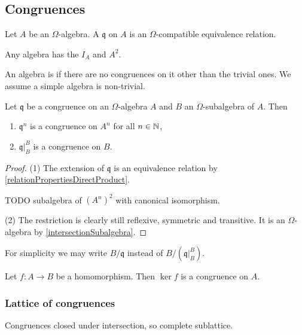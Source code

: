 \subsection{Congruences}
\begin{definition}
Let $A$ be an $\Omega$-algebra. A  $\mathfrak{q}$ on $A$ is an $\Omega$-compatible equivalence relation.
\end{definition}

\begin{example}
Any algebra has the  $I_A$ and $A^2$.
\end{example}

An algebra is  if there are no congruences on it other than the trivial ones. We assume a simple algebra is non-trivial.

\begin{lemma} \label{basicCongruenceLemma}
Let $\mathfrak{q}$ be a congruence on an $\Omega$-algebra $A$ and $B$ an $\Omega$-subalgebra of $A$. Then
\begin{enumerate}
\item $\mathfrak{q}^n$ is a congruence on $A^n$ for all $n\in \mathbb{N}$,
\item $\mathfrak{q}|_B^B$ is a congruence on $B$.
\end{enumerate}
\end{lemma}
\begin{proof}
(1) The extension of $\mathfrak{q}$ is an equivalence relation by \ref{relationPropertiesDirectProduct}.

TODO subalgebra of $(A^n)^2$ with canonical isomorphism.

(2) The restriction is clearly still reflexive, symmetric and transitive. It is an $\Omega$-algebra by \ref{intersectionSubalgebra}.
\end{proof}
For simplicity we may write $B/\mathfrak{q}$ instead of $B/(\mathfrak{q}|_B^B)$.

\begin{proposition} \label{kernelCongruence}
Let $f:A\to B$ be a homomorphism. Then $\ker f$ is a congruence on $A$.
\end{proposition}

\subsubsection{Lattice of congruences}

Congruences closed under intersection, so complete sublattice.

